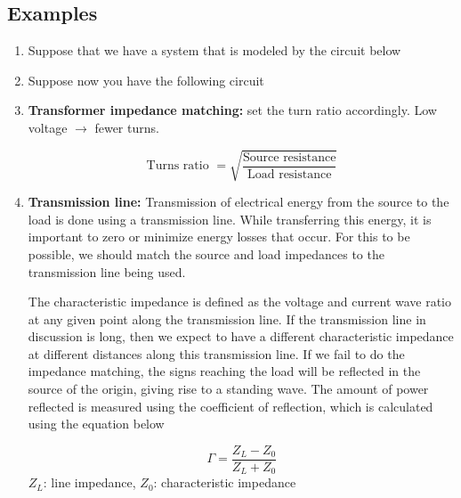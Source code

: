 \subsection{Examples}
\begin{enumerate}
    \item Suppose that we have a system that is modeled by the circuit below
        

    \item Suppose now you have the following circuit
        

    \item \textbf{Transformer impedance matching:} set the turn ratio accordingly. Low voltage $\rightarrow$ fewer turns. 
        \begin{define}
            \[\text{Turns ratio }= \sqrt{\frac{\text{Source resistance}}{\text{Load resistance}}}\]
        \end{define}
    
    \item \textbf{Transmission line:} Transmission of electrical energy from the source to the load is done using a transmission line. While transferring this energy, it is important to zero or minimize energy losses that occur. For this to be possible, we should match the source and load impedances to the transmission line being used.
    
    The characteristic impedance is defined as the voltage and current wave ratio at any given point along the transmission line. 
    If the transmission line in discussion is long, then we expect to have a different characteristic impedance at different distances along this transmission line. 
    If we fail to do the impedance matching, the signs reaching the load will be reflected in the source of the origin, giving rise to a standing wave. 
    The amount of power reflected is measured using the coefficient of reflection, which is calculated using the equation below
        \begin{define}
            \[\Gamma  = \frac{Z_L - Z_0}{Z_L + Z_0}\]
            $Z_L$: line impedance, $Z_0$: characteristic impedance
        \end{define}


\end{enumerate}
